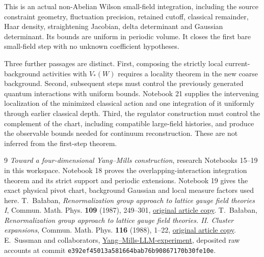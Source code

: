 \documentclass[11pt]{article}
\theoremstyle{remark}
\begin{document}
This is an actual non-Abelian Wilson small-field integration,
including the source constraint geometry, fluctuation
precision, retained cutoff, classical remainder, Haar density,
straightening Jacobian, delta determinant and Gaussian
determinant. Its bounds are uniform in periodic volume.
It closes the first bare small-field step with no unknown
coefficient hypotheses.

Three further passages are distinct. First, composing the
strictly local current-background activities with $V_*(W)$
requires a locality theorem in the new coarse background.
Second, subsequent steps must control the previously generated
quantum interactions with uniform bounds. Notebook 21 supplies
the intervening localization of the minimized classical action
and one integration of it uniformly through earlier classical
depth. Third, the regulator construction must
control the complement of the chart, including compatible
large-field histories, and produce the observable bounds
needed for continuum reconstruction. These are not inferred
from the first-step theorem.

\begin{thebibliography}{9}
\emph{Toward a four-dimensional Yang--Mills construction},
research Notebooks 15--19 in this workspace.
Notebook 18 proves the overlapping-interaction integration
theorem and its strict support and periodic extensions.
Notebook 19 gives the exact physical pivot chart, background
Gaussian and local measure factors used here.
T.~Ba\l aban,
\emph{Renormalization group approach to lattice gauge field
theories I}, Commun. Math. Phys. \textbf{109} (1987), 249--301,
\href{https://scispace.com/pdf/renormalization-group-approach-to-lattice-gauge-field-3ygai0vxt1.pdf}{original article copy}.
T.~Ba\l aban,
\emph{Renormalization group approach to lattice gauge field
theories. II. Cluster expansions},
Commun. Math. Phys. \textbf{116} (1988), 1--22,
\href{https://scispace.com/pdf/renormalization-group-approach-to-lattice-gauge-field-4penm4k7hc.pdf}{original article copy}.
E.~Sussman and collaborators,
\href{https://github.com/ethanwsussman/Yang--Mills-LLM-experiment}{Yang--Mills-LLM-experiment},
deposited raw accounts at commit
\texttt{e392ef4501\allowbreak 3a581664ba\allowbreak b76b908671\allowbreak 70b30fe10e}.
\end{thebibliography}
\end{document}
